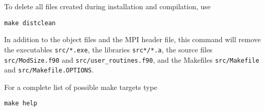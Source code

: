 To delete all files created during installation and compilation, use
\begin{verbatim}
make distclean
\end{verbatim}
In addition to the object files and the MPI header file, 
this command will remove the executables {\tt src/*.exe}, 
the libraries {\tt src*/*.a}, the source files
{\tt src/ModSize.f90} and {\tt src/user\_routines.f90}, 
and the Makefiles {\tt src/Makefile} and {\tt src/Makefile.OPTIONS}.

For a complete list of possible make targets type
\begin{verbatim}
make help
\end{verbatim}

